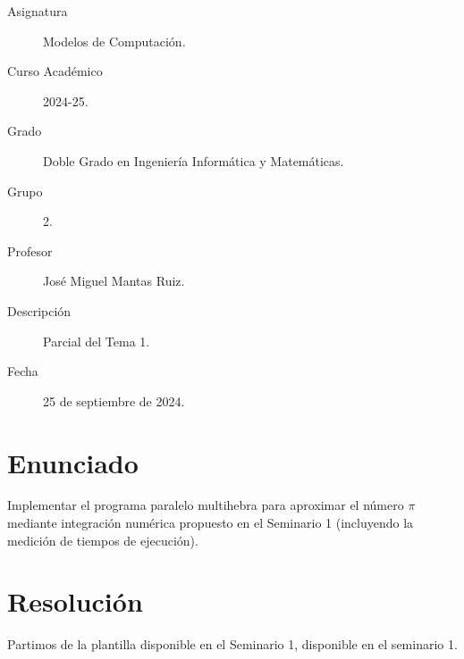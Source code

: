 \documentclass[12pt]{article}
\begin{document}

    
    

    \begin{description}
        \item[Asignatura] Modelos de Computación.
        \item[Curso Académico] 2024-25.
        \item[Grado] Doble Grado en Ingeniería Informática y Matemáticas.
        \item[Grupo] 2.
        \item[Profesor] José Miguel Mantas Ruiz.
        \item[Descripción] Parcial del Tema 1.
        \item[Fecha] 25 de septiembre de 2024.
    
    \end{description}
    \newpage
    
    
    \section{Enunciado}
    Implementar el programa paralelo multihebra para aproximar el número $\pi$ mediante integración numérica propuesto en el Seminario 1 (incluyendo la medición de tiempos de ejecución).

    \section{Resolución}

    Partimos de la plantilla disponible en el Seminario 1, disponible en el seminario 1.
\end{document}
